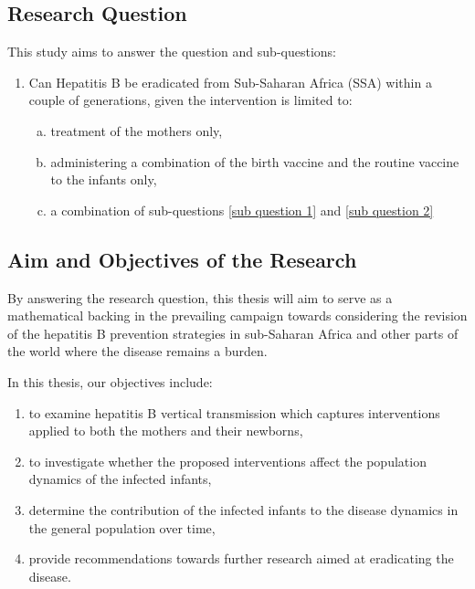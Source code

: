 \subsection{Research Question}
\label{section: research questions}
This study aims to answer the question and sub-questions: 
\begin{enumerate}[1.]
	\item Can Hepatitis B be eradicated from Sub-Saharan Africa (SSA) within a couple of generations, given the intervention is limited to: 
	\begin{enumerate} [(a)]
		\item treatment of the mothers only,  \label{sub question 1}
		\item administering a combination of the birth vaccine and the routine vaccine to the infants only, \label{sub question 2}
		\item a combination of sub-questions \ref{sub question 1} and \ref{sub question 2}
	\end{enumerate}
\end{enumerate}

\subsection{Aim and Objectives of the Research}
By answering the research question, this thesis will aim to serve as a mathematical backing in the prevailing campaign towards considering the revision of the hepatitis B prevention strategies in sub-Saharan Africa and other parts of the world where the disease remains a burden.  

In this thesis, our objectives include:
	\begin{enumerate}
		\item to examine hepatitis B vertical transmission which captures interventions applied to both the mothers and their newborns,
		\item to investigate whether the proposed interventions affect the population dynamics of the infected infants,
		\item determine the contribution of the infected infants to the disease dynamics in the general population over time,
		\item provide recommendations towards further research aimed at eradicating the disease.
		
	\end{enumerate}